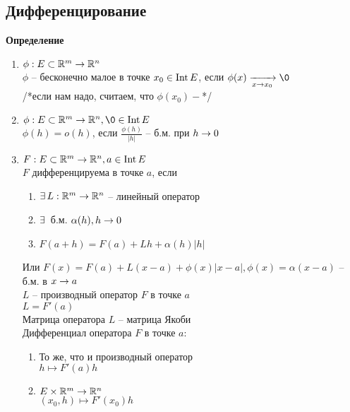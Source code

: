 \documentclass[12pt]{article}
\begin{document}
\subsection{Дифференцирование}
\textbf{Определение}
\begin{enumerate}
    \item $\phi: E \subset \mathbb{R}^m \rightarrow \mathbb{R}^n$\\
    $\phi$ -- бесконечно малое в точке $x_0 \in \operatorname{Int} E$, если $\phi(x) \xrto[x\rto x_0]{} \0$\\
    /*если нам надо, считаем, что $\phi(x_0) - $*/
    \item $\phi: E \subset \Rset^m \rto \Rset^n, \0 \in \nm{Int} E$\\
    $\phi(h) = o(h)$, если $\frac{\phi(h)}{|h|}$ -- б.м. при $h\rightarrow 0$
    \item $F: E\subset \mathbb{R}^m \rightarrow \mathbb{R}^n, a \in \operatorname{Int} E$\\
    $F$ дифференцируема в точке $a$, если
    \begin{enumerate}
        \item $\exists\, L: \mathbb{R}^m \rightarrow \mathbb{R}^n$ -- линейный оператор
        \item $\exists\,$ б.м. $\alpha(h), h \rightarrow 0$
        \item $F(a + h) = F(a) + Lh + \alpha(h)|h|$
    \end{enumerate}
    Или $F(x) = F(a) + L(x-a) + \phi(x)|x-a|, \phi(x) = \alpha(x-a)$ -- б.м. в $x\rightarrow a$\\
    $L$ -- производный оператор $F$ в точке $a$\\
    $L = F'(a)$\\
    Матрица оператора $L$ -- матрица Якоби\\
    Дифференциал оператора $F$ в точке $a$:
    \begin{enumerate}
        \item То же, что и производный оператор\\
        $h\mapsto F'(a) h$
        \item $E \times \mathbb{R}^m \rightarrow \mathbb{R}^n$\\
        $(x_0, h) \mapsto F'(x_0)h$
    \end{enumerate}
\end{enumerate}
\end{document}
